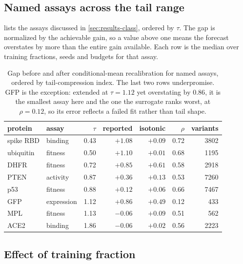 \documentclass{article}
\theoremstyle{plain}
\theoremstyle{definition}
\begin{document}
\subsection{Named assays across the tail range}
\label{app:named}

 lists the assays discussed in \cref{sec:results-class}, ordered by
$\tau$. The gap is normalized by the achievable gain, so a value above one means the
forecast overstates by more than the entire gain available. Each row is the median over
training fractions, seeds and budgets for that assay.

\begin{table}[ht]
\caption{Gap before and after conditional-mean recalibration for named assays, ordered
by tail-compression index. The last two rows underpromise. GFP is the exception:
extended at $\tau = 1.12$ yet overstating by $0.86$, it is the smallest assay here and
the one the surrogate ranks worst, at $\rho = 0.12$, so its error reflects a failed fit
rather than tail shape.}
\label{tab:named}
\vskip 0.1in
\begin{center}
\begin{small}
\begin{tabular}{llrrrrr}
\toprule
protein & assay & $\tau$ & reported & isotonic & $\rho$ & variants \\
\midrule
spike RBD  & binding    & 0.43 & $+1.08$ & $+0.09$ & 0.72 & 3802 \\
ubiquitin  & fitness    & 0.50 & $+1.10$ & $+0.01$ & 0.68 & 1195 \\
DHFR       & fitness    & 0.72 & $+0.85$ & $+0.61$ & 0.58 & 2918 \\
PTEN       & activity   & 0.87 & $+0.36$ & $+0.13$ & 0.53 & 7260 \\
p53        & fitness    & 0.88 & $+0.12$ & $+0.06$ & 0.66 & 7467 \\
GFP        & expression & 1.12 & $+0.86$ & $+0.49$ & 0.12 & \phantom{0}433 \\
MPL        & fitness    & 1.13 & $-0.06$ & $+0.09$ & 0.51 & \phantom{0}562 \\
ACE2       & binding    & 1.86 & $-0.06$ & $+0.02$ & 0.56 & 2223 \\
\bottomrule
\end{tabular}
\end{small}
\end{center}
\vskip -0.1in
\end{table}

\subsection{Effect of training fraction}
\label{app:frac}
\end{document}
